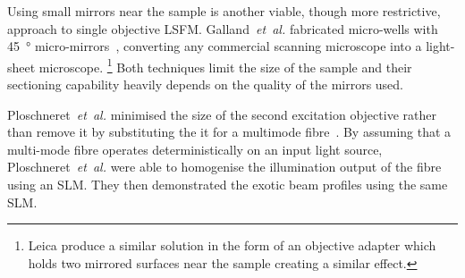 Using small mirrors near the sample is another viable, though more restrictive, approach to single objective \gls{LSFM}.
Galland~\emph{et~al.} fabricated micro-wells with \SI{45}{\degree} micro-mirrors~\cite{galland_3d_2015}, converting any commercial scanning microscope into a \gls{light-sheet} microscope.
\footnote{Leica produce a similar solution in the form of an objective adapter which holds two mirrored surfaces near the sample creating a similar effect.}
Both techniques limit the size of the sample and their sectioning capability heavily depends on the quality of the mirrors used.

Ploschneret~\emph{et~al.} minimised the size of the second excitation objective rather than remove it by substituting the it for a multimode fibre~\cite{ploschner_multimode_2015}.
By assuming that a multi-mode fibre operates deterministically on an input light source, Ploschneret~\emph{et~al.} were able to homogenise the illumination output of the fibre using an \gls{SLM}.
They then demonstrated the \gls{exotic beam} profiles using the same \gls{SLM}.







